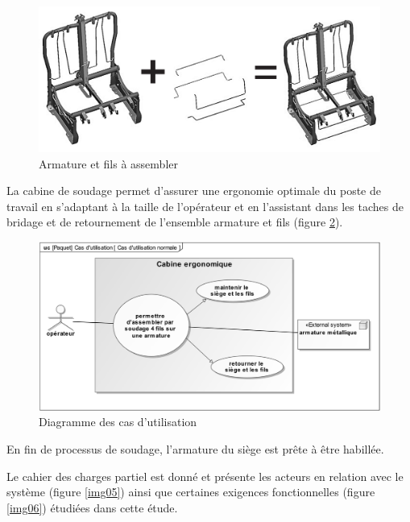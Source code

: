 \begin{figure}[!h]
\centering\includegraphics[width=0.8\linewidth]{img/fig03}
 \caption{Armature et fils à assembler}
 \label{img03}
\end{figure}

La cabine de soudage permet d’assurer une ergonomie optimale du poste de travail en s’adaptant à la taille de l’opérateur et en l’assistant dans les taches de bridage et de retournement de l’ensemble armature et fils (figure \ref{img04}).

\begin{figure}[!h]
\centering\includegraphics[width=\linewidth]{img/fig04}
 \caption{Diagramme des cas d’utilisation}
 \label{img04}
\end{figure}

En fin de processus de soudage, l’armature du siège est prête à être habillée.

Le cahier des charges partiel est donné et présente les acteurs en relation avec le système (figure \ref{img05}) ainsi que certaines exigences fonctionnelles (figure \ref{img06}) étudiées dans cette étude.

